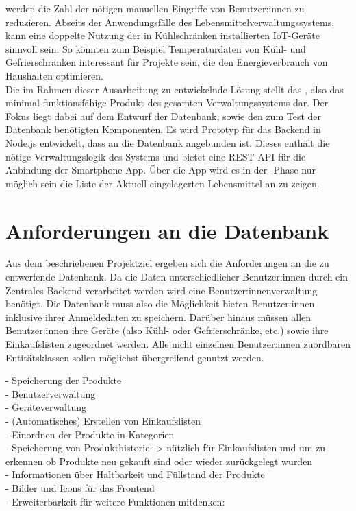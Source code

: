 werden die Zahl der nötigen manuellen Eingriffe von Benutzer:innen zu reduzieren. Abseits der Anwendungsfälle des Lebensmittelverwaltungssystems, kann eine doppelte Nutzung der in Kühlschränken installierten IoT-Geräte sinnvoll sein. So könnten zum Beispiel Temperaturdaten von Kühl- und Gefrierschränken interessant für Projekte sein, die den Energieverbrauch von Haushalten optimieren.\\ Die im Rahmen dieser Ausarbeitung zu entwickelnde Lösung stellt das , also das minimal funktionsfähige Produkt des gesamten Verwaltungssystems dar. Der Fokus liegt dabei auf dem Entwurf der Datenbank, sowie den zum Test der Datenbank benötigten Komponenten. Es wird Prototyp für das \gls{Backend} in Node.js entwickelt, dass an die Datenbank angebunden ist. Dieses enthält die nötige Verwaltungslogik des Systems und bietet eine \gls{REST-API} für die Anbindung der Smartphone-App. Über die App wird es in der -Phase nur möglich sein die Liste der Aktuell eingelagerten Lebensmittel an zu zeigen.

\section{Anforderungen an die Datenbank}\label{sec:Anforderungen an die Datenbank}

Aus dem beschriebenen Projektziel ergeben sich die Anforderungen an die zu entwerfende Datenbank. Da die Daten unterschiedlicher Benutzer:innen durch ein Zentrales \gls{Backend} verarbeitet werden wird eine Benutzer:innenverwaltung benötigt. Die Datenbank muss also die Möglichkeit bieten Benutzer:innen inklusive ihrer Anmeldedaten zu speichern. Darüber hinaus müssen allen Benutzer:innen ihre Geräte (also Kühl- oder Gefrierschränke, etc.) sowie ihre Einkaufslisten zugeordnet werden. Alle nicht einzelnen Benutzer:innen zuordbaren \Gls{Entitätsklasse}n sollen möglichst übergreifend genutzt werden.

- Speicherung der Produkte\\
- Benutzerverwaltung\\
- Geräteverwaltung\\
- (Automatisches) Erstellen von Einkaufslisten\\
- Einordnen der Produkte in Kategorien\\
- Speicherung von Produkthistorie -> nützlich für Einkaufslisten und um zu erkennen ob Produkte neu gekauft sind oder wieder zurückgelegt wurden\\
- Informationen über Haltbarkeit und Füllstand der Produkte\\
- Bilder und Icons für das Frontend\\
- Erweiterbarkeit für weitere Funktionen mitdenken:\\
